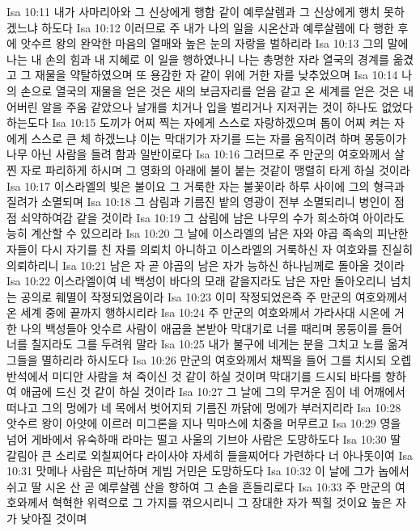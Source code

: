 Isa 10:11  내가 사마리아와 그 신상에게 행함 같이 예루살렘과 그 신상에게 행치 못하겠느냐 하도다
Isa 10:12  이러므로 주 내가 나의 일을 시온산과 예루살렘에 다 행한 후에 앗수르 왕의 완악한 마음의 열매와 높은 눈의 자랑을 벌하리라
Isa 10:13  그의 말에 나는 내 손의 힘과 내 지혜로 이 일을 행하였나니 나는 총명한 자라 열국의 경계를 옮겼고 그 재물을 약탈하였으며 또 용감한 자 같이 위에 거한 자를 낮추었으며
Isa 10:14  나의 손으로 열국의 재물을 얻은 것은 새의 보금자리를 얻음 같고 온 세계를 얻은 것은 내어버린 알을 주움 같았으나 날개를 치거나 입을 벌리거나 지저귀는 것이 하나도 없었다 하는도다
Isa 10:15  도끼가 어찌 찍는 자에게 스스로 자랑하겠으며 톱이 어찌 켜는 자에게 스스로 큰 체 하겠느냐 이는 막대기가 자기를 드는 자를 움직이려 하며 몽둥이가 나무 아닌 사람을 들려 함과 일반이로다
Isa 10:16  그러므로 주 만군의 여호와께서 살찐 자로 파리하게 하시며 그 영화의 아래에 불이 붙는 것같이 맹렬히 타게 하실 것이라
Isa 10:17  이스라엘의 빛은 불이요 그 거룩한 자는 불꽃이라 하루 사이에 그의 형극과 질려가 소멸되며
Isa 10:18  그 삼림과 기름진 밭의 영광이 전부 소멸되리니 병인이 점점 쇠약하여감 같을 것이라
Isa 10:19  그 삼림에 남은 나무의 수가 희소하여 아이라도 능히 계산할 수 있으리라
Isa 10:20  그 날에 이스라엘의 남은 자와 야곱 족속의 피난한 자들이 다시 자기를 친 자를 의뢰치 아니하고 이스라엘의 거룩하신 자 여호와를 진실히 의뢰하리니
Isa 10:21  남은 자 곧 야곱의 남은 자가 능하신 하나님께로 돌아올 것이라
Isa 10:22  이스라엘이여 네 백성이 바다의 모래 같을지라도 남은 자만 돌아오리니 넘치는 공의로 훼멸이 작정되었음이라
Isa 10:23  이미 작정되었은즉 주 만군의 여호와께서 온 세계 중에 끝까지 행하시리라
Isa 10:24  주 만군의 여호와께서 가라사대 시온에 거한 나의 백성들아 앗수르 사람이 애굽을 본받아 막대기로 너를 때리며 몽둥이를 들어 너를 칠지라도 그를 두려워 말라
Isa 10:25  내가 불구에 네게는 분을 그치고 노를 옮겨 그들을 멸하리라 하시도다
Isa 10:26  만군의 여호와께서 채찍을 들어 그를 치시되 오렙 반석에서 미디안 사람을 쳐 죽이신 것 같이 하실 것이며 막대기를 드시되 바다를 향하여 애굽에 드신 것 같이 하실 것이라
Isa 10:27  그 날에 그의 무거운 짐이 네 어깨에서 떠나고 그의 멍에가 네 목에서 벗어지되 기름진 까닭에 멍에가 부러지리라
Isa 10:28  앗수르 왕이 아얏에 이르러 미그론을 지나 믹마스에 치중을 머무르고
Isa 10:29  영을 넘어 게바에서 유숙하매 라마는 떨고 사울의 기브아 사람은 도망하도다
Isa 10:30  딸 갈림아 큰 소리로 외칠찌어다 라이사야 자세히 들을찌어다 가련하다 너 아나돗이여
Isa 10:31  맛메나 사람은 피난하며 게빔 거민은 도망하도다
Isa 10:32  이 날에 그가 놉에서 쉬고 딸 시온 산 곧 예루살렘 산을 향하여 그 손을 흔들리로다
Isa 10:33  주 만군의 여호와께서 혁혁한 위력으로 그 가지를 꺾으시리니 그 장대한 자가 찍힐 것이요 높은 자가 낮아질 것이며
